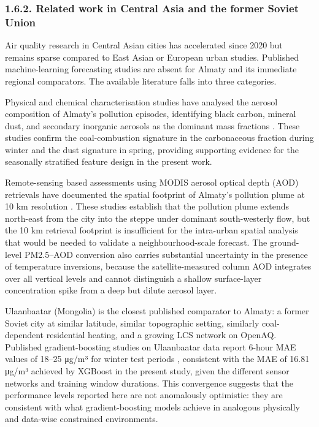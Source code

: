 \subsubsection{1.6.2. Related work in Central Asia and the former Soviet Union}\label{related-work-in-central-asia-and-the-former-soviet-union}

Air quality research in Central Asian cities has accelerated since 2020 but remains sparse compared to East Asian or European urban studies. Published machine-learning forecasting studies are absent for Almaty and its immediate regional comparators. The available literature falls into three categories.

Physical and chemical characterisation studies have analysed the aerosol composition of Almaty's pollution episodes, identifying black carbon, mineral dust, and secondary inorganic aerosols as the dominant mass fractions \cite{Kerimray2020, Tursumbayeva2022}. These studies confirm the coal-combustion signature in the carbonaceous fraction during winter and the dust signature in spring, providing supporting evidence for the seasonally stratified feature design in the present work.

Remote-sensing based assessments using MODIS aerosol optical depth (AOD) retrievals have documented the spatial footprint of Almaty's pollution plume at 10 km resolution \cite{Kerimray2020}. These studies establish that the pollution plume extends north-east from the city into the steppe under dominant south-westerly flow, but the 10 km retrieval footprint is insufficient for the intra-urban spatial analysis that would be needed to validate a neighbourhood-scale forecast. The ground-level PM2.5--AOD conversion also carries substantial uncertainty in the presence of temperature inversions, because the satellite-measured column AOD integrates over all vertical levels and cannot distinguish a shallow surface-layer concentration spike from a deep but dilute aerosol layer.

Ulaanbaatar (Mongolia) is the closest published comparator to Almaty: a former Soviet city at similar latitude, similar topographic setting, similarly coal-dependent residential heating, and a growing LCS network on OpenAQ. Published gradient-boosting studies on Ulaanbaatar data report 6-hour MAE values of 18--25 μg/m³ for winter test periods \cite{enebish2021ulaanbaatar}, consistent with the MAE of 16.81 μg/m³ achieved by XGBoost in the present study, given the different sensor networks and training window durations. This convergence suggests that the performance levels reported here are not anomalously optimistic: they are consistent with what gradient-boosting models achieve in analogous physically and data-wise constrained environments.

